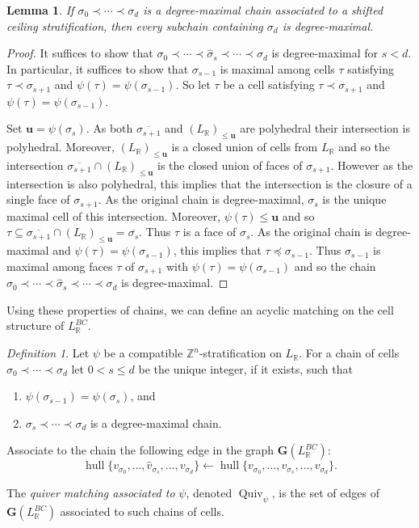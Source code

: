 \documentclass{amsart}
\newcommand{\ZZ}{\mathbb{Z}}
\newcommand{\RR}{\mathbb{R}}
\newcommand{\graph}{\mathbf{G}}
\newcommand{\Quiv}{\operatorname{Quiv}}
\DeclareMathOperator{\hull}{hull}
\newtheorem{lemma}[theorem]{Lemma}
\theoremstyle{remark}
\newtheorem{definition}[theorem]{Definition}
\begin{document}
\begin{lemma}
  \label{lem:degree-maximal-subchains}
  If $\sigma_0\prec \cdots \prec \sigma_d$ is a degree-maximal chain associated to a shifted ceiling stratification, then every subchain containing $\sigma_d$ is degree-maximal.
\end{lemma}
\begin{proof}
  It suffices to show that $\sigma_0\prec \cdots \prec \widehat{\sigma}_s\prec \cdots \prec \sigma_d$ is degree-maximal for $s<d$.
  In particular, it suffices to show that $\sigma_{s-1}$ is maximal among cells $\tau$ satisfying $\tau\prec \sigma_{s+1}$ and $\psi(\tau)=\psi(\sigma_{s-1})$.
  So let $\tau$ be a cell satisfying $\tau \prec \sigma_{s+1}$ and $\psi(\tau)=\psi(\sigma_{s-1})$.

  Set $\bm{u} = \psi(\sigma_s)$. As both $\overline{\sigma_{s+1}}$ and $(L_{\RR})_{\leq \bm{u}}$ are polyhedral their intersection is polyhedral.
  Moreover, $(L_{\RR})_{\leq \bm{u}}$ is a closed union of cells from $L_{\RR}$ and so the intersection
  $\overline{\sigma_{s+1}}\cap (L_{\RR})_{\leq \bm{u}}$ is the closed union of faces of $\sigma_{s+1}$.
  However as the intersection is also polyhedral, this implies that the intersection is the closure of a single face of $\sigma_{s+1}$.
  As the original chain is degree-maximal, $\sigma_s$ is the unique maximal cell of this intersection.
  Moreover, $\psi(\tau)\leq \bm{u}$ and so $\tau\subseteq \overline{\sigma_{s+1}}\cap (L_{\RR})_{\leq \bm{u}}=\overline{\sigma_s}$.
  Thus $\tau$ is a face of $\sigma_s$.
  As the original chain is degree-maximal and $\psi(\tau)=\psi(\sigma_{s-1})$, this implies that $\tau\preceq \sigma_{s-1}$.
  Thus $\sigma_{s-1}$ is maximal among faces $\tau$ of $\sigma_{s+1}$ with $\psi(\tau)=\psi(\sigma_{s-1})$
  and so the chain $\sigma_0\prec \cdots \prec \widehat{\sigma}_s\prec \cdots \prec \sigma_d$ is degree-maximal.
\end{proof}


Using these properties of chains, we can define an acyclic matching on the cell structure of $L_{\RR}^{BC}$.

\begin{definition}
  \label{def:quiver-matching}
  Let $\psi$ be a compatible $\ZZ^n$-stratification on $L_{\RR}$.
  For a chain of cells $\sigma_0\prec \cdots \prec \sigma_d$ let $0<s\leq d$ be the unique integer, if it exists, such that
  \begin{enumerate}
  \item $\psi(\sigma_{s-1}) = \psi(\sigma_s)$, and
  \item $\sigma_s\prec \cdots \prec \sigma_d$ is a degree-maximal chain.
  \end{enumerate}
  Associate to the chain the following edge in the graph $\graph(L_{\RR}^{BC})$:
  \[\hull\{v_{\sigma_0},\ldots,\widehat{v}_{\sigma_s},\ldots,v_{\sigma_d}\}\leftarrow \hull\{v_{\sigma_0},\ldots,v_{\sigma_s},\ldots,v_{\sigma_{d}}\}.\]

  The \emph{quiver matching associated to} $\psi$, denoted $\Quiv_\psi$, is the set of edges of $\graph(L_{\RR}^{BC})$ associated to such chains of cells.
\end{definition}
\end{document}
